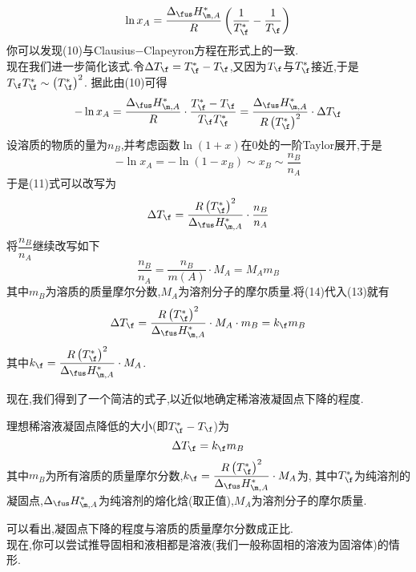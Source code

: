 \documentclass{ctexart}
\begin{document}
\begin{derivation}
\begin{equation}
        \ln x_A=\dfrac{\Delta_{\fus}H_{\m,A}^\ast}{R}\left(\dfrac{1}{T_\f^\ast}-\dfrac{1}{T_\f}\right)
    \end{equation}
    你可以发现(10)与Clausius$-$Clapeyron方程在形式上的一致.\\
    现在我们进一步简化该式.令$\Delta T_\f=T_\f^\ast-T_\f$,又因为$T_\f$与$T_\f^\ast$接近,于是$T_\f T_\f^\ast\sim\left(T_\f^\ast\right)^2$.%
    据此由(10)可得
    \begin{equation}
        -\ln x_A=\dfrac{\Delta_{\fus}H_{\m,A}^\ast}{R}\cdot\dfrac{T_\f^\ast-T_\f}{T_\f T_\f^\ast}
        =\dfrac{\Delta_{\fus}H_{\m,A}^\ast}{R\left(T_\f^\ast\right)^2}\cdot\Delta T_\f
    \end{equation}
    设溶质的物质的量为$n_B$,并考虑函数$\ln(1+x)$在$0$处的一阶Taylor展开,于是
    \begin{equation}
        -\ln x_A=-\ln\left(1-x_B\right)\sim x_B\sim\dfrac{n_B}{n_A}
    \end{equation}
    于是(11)式可以改写为
    \begin{equation}
        \Delta T_\f=\dfrac{R\left(T_\f^\ast\right)^2}{\Delta_{\fus}H_{\m,A}^\ast}\cdot\dfrac{n_B}{n_A}
    \end{equation}
    将$\dfrac{n_B}{n_A}$继续改写如下
    \begin{equation}
        \dfrac{n_B}{n_A}=\dfrac{n_B}{m(A)}\cdot M_A=M_A m_B
    \end{equation}
    其中$m_B$为溶质的质量摩尔分数,$M_A$为溶剂分子的摩尔质量.将(14)代入(13)就有
    \begin{equation}
        \Delta T_\f=\dfrac{R\left(T_\f^\ast\right)^2}{\Delta_{\fus}H_{\m,A}^\ast}\cdot M_A\cdot m_B=k_\f m_B
    \end{equation}
    其中$k_\f=\dfrac{R\left(T_\f^\ast\right)^2}{\Delta_{\fus}H_{\m,A}^\ast}\cdot M_A$.
\end{derivation}
现在,我们得到了一个简洁的式子,以近似地确定稀溶液凝固点下降的程度.
\begin{theorem}[4C.3.1 凝固点降低]
    理想稀溶液凝固点降低的大小(即$T_\f^\ast-T_\f$)为
    \[\Delta T_\f=k_\f m_B\]
    其中$m_B$为所有溶质的质量摩尔分数,$k_\f=\dfrac{R\left(T_\f^\ast\right)^2}{\Delta_{\fus}H_{\m,A}^\ast}\cdot M_A$为,%
    其中$T_\f^\ast$为纯溶剂的凝固点,$\Delta_{\fus}H_{\m,A}^\ast$为纯溶剂的熔化焓(取正值),$M_A$为溶剂分子的摩尔质量.
\end{theorem}
可以看出,凝固点下降的程度与溶质的质量摩尔分数成正比.\\
\indent 现在,你可以尝试推导固相和液相都是溶液(我们一般称固相的溶液为固溶体)的情形.%
\end{document}
